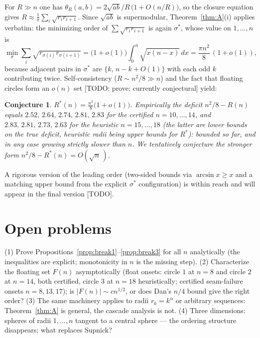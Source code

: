 \documentclass[11pt]{article}
\newtheorem{conjecture}[theorem]{Conjecture}
\theoremstyle{definition}
\theoremstyle{remark}
\DeclareMathOperator{\asin}{arcsin}
\begin{document}
For $R\gg n$ one has $\theta_R(a,b)=2\sqrt{ab}/R\,\big(1+O(n/R)\big)$, so the closure equation gives
$R\approx\frac1\pi\sum_i\sqrt{r_ir_{i+1}}$. Since $\sqrt{ab}$ is supermodular, Theorem~\ref{thm:A}(i) applies verbatim: the minimizing order of $\sum\sqrt{r_ir_{i+1}}$ is again $\sigma^\ast$, whose value on $1,\dots,n$ is
\[
\min_\sigma\sum_i\sqrt{r_{\sigma(i)}r_{\sigma(i+1)}}
=\Big(1+o(1)\Big)\int_0^n\sqrt{x(n-x)}\,dx=\frac{\pi n^2}{8}\,(1+o(1)),
\]
because adjacent pairs in $\sigma^\ast$ are $\{k,\,n-k+O(1)\}$ with each odd $k$ contributing twice. Self-consistency ($R\sim n^2/8\gg n$) and the fact that floating circles form an $o(n)$ set [TODO: prove; currently conjectural] yield:

\begin{conjecture}\label{conj:asym}
$\displaystyle R^\ast(n)=\frac{n^2}{8}\big(1+o(1)\big)$. Empirically the deficit $n^2/8-R(n)$ equals $2.52,\,2.64,\,2.74,\,2.81,\,2.83$ for the certified $n=10,\dots,14$, and $2.83,\,2.81,\,2.73,\,2.63$ for the heuristic $n=15,\dots,18$ (the latter are \emph{lower} bounds on the true deficit, heuristic radii being upper bounds for $R^\ast$): bounded so far, and in any case growing strictly slower than $n$. We tentatively conjecture the stronger form $n^2/8-R^\ast(n)=O(\sqrt n\,)$.
\end{conjecture}

A rigorous version of the leading order (two-sided bounds via $\asin x\ge x$ and a matching upper bound from the explicit $\sigma^\ast$ configuration) is within reach and will appear in the final version [TODO].

\section{Open problems}

(1) Prove Propositions~\ref{prop:break1}--\ref{prop:break3} for all $n$ analytically (the inequalities are explicit; monotonicity in $n$ is the missing step). (2) Characterize the floating set $F(n)$ asymptotically (float onsets: circle $1$ at $n=8$ and circle $2$ at $n=14$, both certified, circle $3$ at $n=18$ heuristically; certified seam-failure onsets $n=8,13,17$); is $|F(n)|\sim cn^{1/2}$, or does Dan's $n/4$ bound give the right order? (3) The same machinery applies to radii $r_k=k^\alpha$ or arbitrary sequences: Theorem~\ref{thm:A} is general, the cascade analysis is not. (4) Three dimensions: spheres of radii $1,\dots,n$ tangent to a central sphere --- the ordering structure disappears; what replaces Supnick? 
\end{document}
